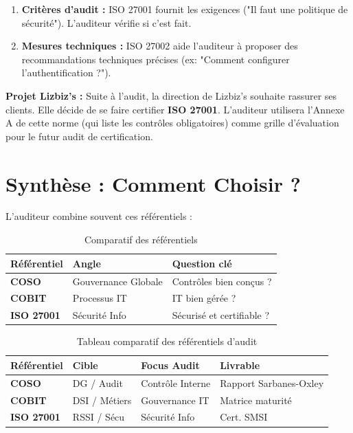 \begin{enumerate}
    \item \textbf{Critères d'audit :} ISO 27001 fournit les exigences ("Il faut une politique de sécurité"). L'auditeur vérifie si c'est fait.
    \item \textbf{Mesures techniques :} ISO 27002 aide l'auditeur à proposer des recommandations techniques précises (ex: "Comment configurer l'authentification ?").
\end{enumerate}

\begin{boxlizbiz}
\textbf{Projet Lizbiz's :}
Suite à l'audit, la direction de Lizbiz's souhaite rassurer ses clients. Elle décide de se faire certifier \textbf{ISO 27001}. L'auditeur utilisera l'Annexe A de cette norme (qui liste les contrôles obligatoires) comme grille d'évaluation pour le futur audit de certification.
\end{boxlizbiz}

\section{Synthèse : Comment Choisir ?}

L'auditeur combine souvent ces référentiels :

\begin{table}[h!]
\centering
\footnotesize
\setlength{\tabcolsep}{3pt}
\begin{tabular}{p{2.8cm}p{3.8cm}p{4.2cm}}
    \toprule
    \textbf{Référentiel} & \textbf{Angle} & \textbf{Question clé} \\
    \midrule
    \textbf{COSO} & Gouvernance Globale & Contrôles bien conçus ? \\
    \textbf{COBIT} & Processus IT & IT bien gérée ? \\
    \textbf{ISO 27001} & Sécurité Info & Sécurisé et certifiable ? \\
    \bottomrule
\end{tabular}
\caption{Comparatif des référentiels}
\end{table}

\begin{table}[h!]
\centering
\footnotesize
\setlength{\tabcolsep}{2pt}
\renewcommand{\arraystretch}{1.2}
\begin{tabular}{|p{1.7cm}|p{1.9cm}|p{2cm}|p{2.2cm}|}
    \hline
    \rowcolor{blue!10} \textbf{Référentiel} & \textbf{Cible} & \textbf{Focus Audit} & \textbf{Livrable} \\ \hline
    \textbf{COSO} & DG / Audit & Contrôle Interne & Rapport Sarbanes-Oxley \\ \hline
    \textbf{COBIT} & DSI / Métiers & Gouvernance IT & Matrice maturité \\ \hline
    \textbf{ISO 27001} & RSSI / Sécu & Sécurité Info & Cert. SMSI \\ \hline
\end{tabular}
\caption{Tableau comparatif des référentiels d'audit}
\end{table}

